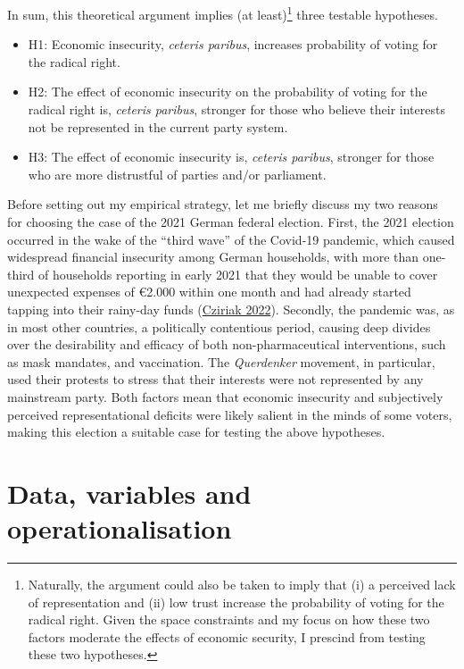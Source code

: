 \documentclass[
]{article}
\providecommand{\tightlist}{%
  \setlength{\itemsep}{0pt}\setlength{\parskip}{0pt}}
\begin{document}
In sum, this theoretical argument implies (at least)\footnote{Naturally,
  the argument could also be taken to imply that (i) a perceived lack of
  representation and (ii) low trust increase the probability of voting
  for the radical right. Given the space constraints and my focus on how
  these two factors moderate the effects of economic security, I
  prescind from testing these two hypotheses.} three testable
hypotheses.

\begin{itemize}
\tightlist
\item
  H1: Economic insecurity, \emph{ceteris paribus}, increases probability
  of voting for the radical right.
\item
  H2: The effect of economic insecurity on the probability of voting for
  the radical right is, \emph{ceteris paribus}, stronger for those who
  believe their interests not be represented in the current party
  system.
\item
  H3: The effect of economic insecurity is, \emph{ceteris paribus},
  stronger for those who are more distrustful of parties and/or
  parliament.
\end{itemize}

Before setting out my empirical strategy, let me briefly discuss my two
reasons for choosing the case of the 2021 German federal election.
First, the 2021 election occurred in the wake of the ``third wave'' of
the Covid-19 pandemic, which caused widespread financial insecurity
among German households, with more than one-third of households
reporting in early 2021 that they would be unable to cover unexpected
expenses of €2.000 within one month and had already started tapping into
their rainy-day funds
(\protect\hyperlink{ref-cziriak_publication_nodate}{Cziriak 2022}).
Secondly, the pandemic was, as in most other countries, a politically
contentious period, causing deep divides over the desirability and
efficacy of both non-pharmaceutical interventions, such as mask
mandates, and vaccination. The \emph{Querdenker} movement, in
particular, used their protests to stress that their interests were not
represented by any mainstream party. Both factors mean that economic
insecurity and subjectively perceived representational deficits were
likely salient in the minds of some voters, making this election a
suitable case for testing the above hypotheses.

\hypertarget{data-variables-and-operationalisation}{%
\section{Data, variables and
operationalisation}\label{data-variables-and-operationalisation}}
\end{document}
